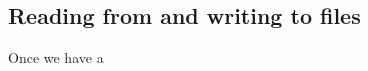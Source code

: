 \subsection{Reading from and writing to files}
\label{sec:reading-from-writing}

Once we have a 

%
% 
%


